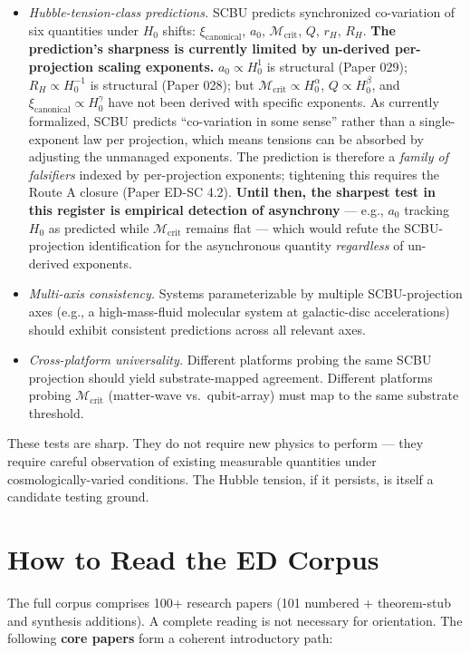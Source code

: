 \documentclass[11pt,a4paper]{article}
\begin{document}
\begin{itemize}[noitemsep]
\item \emph{Hubble-tension-class predictions.} SCBU predicts synchronized co-variation of six quantities under $H_0$ shifts: $\xi_\mathrm{canonical}$, $a_0$, $\mathcal{M}_\mathrm{crit}$, $Q$, $r_H$, $R_H$. \textbf{The prediction's sharpness is currently limited by un-derived per-projection scaling exponents.} $a_0 \propto H_0^1$ is structural (Paper 029); $R_H \propto H_0^{-1}$ is structural (Paper 028); but $\mathcal{M}_\mathrm{crit} \propto H_0^\alpha$, $Q \propto H_0^\beta$, and $\xi_\mathrm{canonical} \propto H_0^\gamma$ have not been derived with specific exponents. As currently formalized, SCBU predicts ``co-variation in some sense'' rather than a single-exponent law per projection, which means tensions can be absorbed by adjusting the unmanaged exponents. The prediction is therefore a \emph{family of falsifiers} indexed by per-projection exponents; tightening this requires the Route A closure (Paper ED-SC 4.2). \textbf{Until then, the sharpest test in this register is empirical detection of asynchrony} --- e.g., $a_0$ tracking $H_0$ as predicted while $\mathcal{M}_\mathrm{crit}$ remains flat --- which would refute the SCBU-projection identification for the asynchronous quantity \emph{regardless} of un-derived exponents.
\item \emph{Multi-axis consistency.} Systems parameterizable by multiple SCBU-projection axes (e.g., a high-mass-fluid molecular system at galactic-disc accelerations) should exhibit consistent predictions across all relevant axes.
\item \emph{Cross-platform universality.} Different platforms probing the same SCBU projection should yield substrate-mapped agreement. Different platforms probing $\mathcal{M}_\mathrm{crit}$ (matter-wave vs.\ qubit-array) must map to the same substrate threshold.
\end{itemize}

These tests are sharp. They do not require new physics to perform --- they require careful observation of existing measurable quantities under cosmologically-varied conditions. The Hubble tension, if it persists, is itself a candidate testing ground.

\section{How to Read the ED Corpus}

The full corpus comprises 100+ research papers (101 numbered + theorem-stub and synthesis additions). A complete reading is not necessary for orientation. The following \textbf{core papers} form a coherent introductory path:
\end{document}
